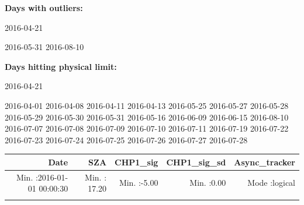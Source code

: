 \documentclass[
  10pt,
  a4paper,oneside]{article}
\begin{document}
\normalsize

\textbf{Days with outliers:}

2016-04-21

2016-05-31 2016-08-10

\textbf{Days hitting physical limit:}

2016-04-21

2016-04-01 2016-04-08 2016-04-11 2016-04-13 2016-05-25 2016-05-27 2016-05-28 2016-05-29 2016-05-30 2016-05-31 2016-05-16 2016-06-09 2016-06-15 2016-08-10 2016-07-07 2016-07-08 2016-07-09 2016-07-10 2016-07-11 2016-07-19 2016-07-22 2016-07-23 2016-07-24 2016-07-25 2016-07-26 2016-07-27 2016-07-28

\footnotesize

\begin{longtable}[]{@{}rrrrr@{}}
\toprule
\begin{minipage}[b]{0.27\columnwidth}\raggedleft
Date\strut
\end{minipage} & \begin{minipage}[b]{0.16\columnwidth}\raggedleft
SZA\strut
\end{minipage} & \begin{minipage}[b]{0.15\columnwidth}\raggedleft
CHP1\_sig\strut
\end{minipage} & \begin{minipage}[b]{0.14\columnwidth}\raggedleft
CHP1\_sig\_sd\strut
\end{minipage} & \begin{minipage}[b]{0.15\columnwidth}\raggedleft
Async\_tracker\strut
\end{minipage}\tabularnewline
\midrule
\endhead
\begin{minipage}[t]{0.27\columnwidth}\raggedleft
Min. :2016-01-01 00:00:30\strut
\end{minipage} & \begin{minipage}[t]{0.16\columnwidth}\raggedleft
Min. : 17.20\strut
\end{minipage} & \begin{minipage}[t]{0.15\columnwidth}\raggedleft
Min. :-5.00\strut
\end{minipage} & \begin{minipage}[t]{0.14\columnwidth}\raggedleft
Min. :0.00\strut
\end{minipage} & \begin{minipage}[t]{0.15\columnwidth}\raggedleft
Mode :logical\strut
\end{minipage}\tabularnewline
\begin{minipage}[t]{0.27\columnwidth}\raggedleft

\end{minipage}
\end{longtable}
\end{document}
